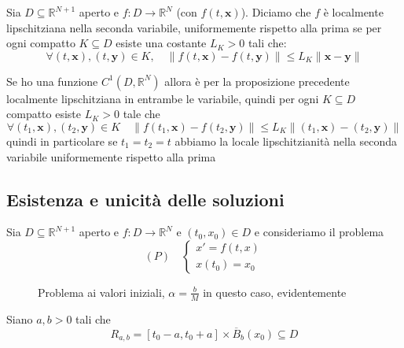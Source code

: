 \begin{definition}
    Sia \(D \subseteq \mathbb{R}^{N + 1} \) aperto e \(f : D \to
    \mathbb{R}^{N}\) (con \(f(t, \mathbf{x})\)). Diciamo che \(f\) è localmente lipschitziana nella seconda
    variabile, uniformemente rispetto alla prima se per ogni compatto \(K
    \subseteq D\) esiste una costante \(L_K >0\) tali che:
    \[
        \forall (t, \mathbf{x}), (t, \mathbf{y}) \in K, \quad \|f(t, \mathbf{x})
        - f(t, \mathbf{y})\| \le L_K \|\mathbf{x} - \mathbf{y}\|
    \]
\end{definition}
\begin{remark}
    Se ho una funzione \(C^{1}(D, \mathbb{R}^{N})\) allora è per la proposizione
    precedente localmente lipschitziana in entrambe le variabile, quindi per
    ogni \(K\subseteq D  \) compatto esiste \(L_K > 0\) tale che
    \[
        \forall (t_{1}, \mathbf{x}), (t_{2}, \mathbf{y}) \in K \quad \|f(t_{1},
        \mathbf{x}) - f(t_{2}, \mathbf{y})\| \le L_K \|(t_{1}, \mathbf{x}) - (t_{2},
        \mathbf{y})\|
    \]
    quindi in particolare se \(t_{1}=t_{2}=t\) abbiamo la locale lipschitzianità
    nella seconda variabile uniformemente rispetto alla prima
\end{remark}

\subsection{Esistenza e unicità delle soluzioni}
Sia \(D \subseteq \mathbb{R}^{N+1} \) aperto e \(f : D\to \mathbb{R}^{N}\) e
\((t_{0}, x_{0}) \in D\) e consideriamo il problema
\[
    (P) \quad
    \begin{cases}
        x' = f(t, x) \\
        x(t_{0}) = x_{0}
    \end{cases}
\]
\begin{figure}[ht]
    \centering
    \caption{Problema ai valori iniziali, \(\alpha = \frac{b}{M}\) in questo
    caso, evidentemente}\label{fig:problema}
\end{figure}
Siano \(a, b > 0\) tali che 
\[
    R_{a, b}  = [t_{0} - a, t_{0} + a] \times \overline{B}_{b}(x_{0}) \subseteq
    D
\]

